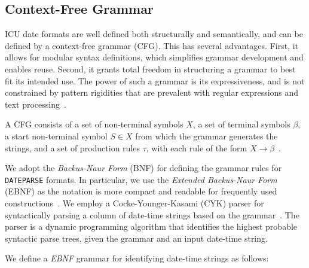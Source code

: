 \subsection{Context-Free Grammar}
ICU date formats are well defined both structurally and semantically, and can be defined by a context-free grammar (CFG). This has several advantages. First, it allows for modular syntax definitions, which simplifies grammar development and enables reuse. Second, it grants total freedom in structuring a grammar to best fit its intended use. The power of such a grammar is its expressiveness, and is not constrained by pattern rigidities that are prevalent with regular expressions and text processing~\cite{Grune:1990}.


A CFG consists of a set of non-terminal symbols $X$, a set of terminal symbols $\beta$, a start non-terminal symbol $S \in X$ from which the grammar generates the strings, and a set of production rules $\tau$, with each rule of the form $X \rightarrow \beta$~\cite{Hopcroft:1990}. 

We adopt the \textit{Backus-Naur Form} (BNF) for defining the grammar rules for \texttt{DATEPARSE} formats. In particular, we use the \textit{Extended Backus-Naur Form} (EBNF) as the notation is more compact and readable for frequently used constructions~\cite{Grune:1990}. We employ a Cocke-Younger-Kasami (CYK) parser for syntactically parsing a column of date-time strings based on the grammar~\cite{Cocke:1969,Younger67,Kasami:1965}. The parser is a dynamic programming algorithm that identifies the highest probable syntactic parse trees, given the grammar and an input date-time string.


We define a \textit{EBNF} grammar for identifying date-time strings as follows:


